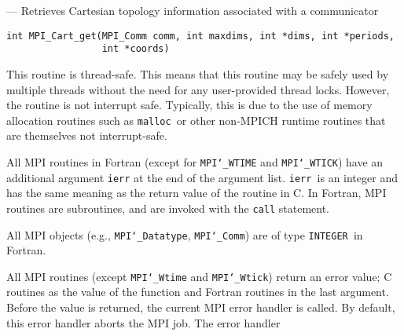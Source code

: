 \startmanpage
{}
--- Retrieves Cartesian topology information associated with a  communicator 
\startvb\begin{verbatim}
int MPI_Cart_get(MPI_Comm comm, int maxdims, int *dims, int *periods, 
                 int *coords)

\end{verbatim}
\endvb

\par
{}
\par
{}
\par
This routine is thread-safe.  This means that this routine may be
safely used by multiple threads without the need for any user-provided
thread locks.  However, the routine is not interrupt safe.  Typically,
this is due to the use of memory allocation routines such as {\tt malloc
}or other non-MPICH runtime routines that are themselves not interrupt-safe.
\par
{}
All MPI routines in Fortran (except for {\tt MPI{\tt \char`\_}WTIME} and {\tt MPI{\tt \char`\_}WTICK}) have
an additional argument {\tt ierr} at the end of the argument list.  {\tt ierr
}is an integer and has the same meaning as the return value of the routine
in C.  In Fortran, MPI routines are subroutines, and are invoked with the
{\tt call} statement.
\par
All MPI objects (e.g., {\tt MPI{\tt \char`\_}Datatype}, {\tt MPI{\tt \char`\_}Comm}) are of type {\tt INTEGER
}in Fortran.
\par
{}
\par
All MPI routines (except {\tt MPI{\tt \char`\_}Wtime} and {\tt MPI{\tt \char`\_}Wtick}) return an error value;
C routines as the value of the function and Fortran routines in the last
argument.  Before the value is returned, the current MPI error handler is
called.  By default, this error handler aborts the MPI job.  The error handler
